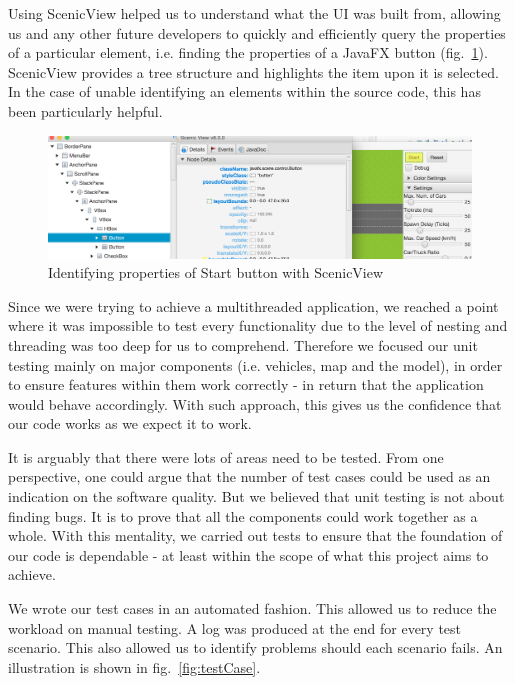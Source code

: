 Using ScenicView helped us to understand what the UI was built from, allowing us and any other future developers to quickly and efficiently query the properties of a particular element, i.e. finding the properties of a JavaFX button (fig.~\ref{fig:scenicview}). ScenicView provides a tree structure and highlights the item upon it is selected. In the case of unable identifying an elements within the source code, this has been particularly helpful.  
\begin{figure}[h]
	\begin{center}
		\includegraphics[width=\textwidth]{img/scenicView.png}
		\caption[Identifying properties of Start button with ScenicView]{Identifying properties of Start button with ScenicView}
		\label{fig:scenicview}
	\end{center}
\end{figure}

Since we were trying to achieve a multithreaded application, we reached a point where it was impossible to test every functionality due to the level of nesting and threading was too deep for us to comprehend. Therefore we focused our unit testing mainly on major components (i.e. vehicles, map and the model), in order to ensure features within them work correctly - in return that the application would behave accordingly. With such approach, this gives us the confidence that our code works as we expect it to work. 

It is arguably that there were lots of areas need to be tested. From one perspective, one could argue that the number of test cases could be used as an indication on the software quality. But we believed that unit testing is not about finding bugs. It is to prove that all the components could work together as a whole.  With this mentality, we carried out tests to ensure that the foundation of our code is dependable - at least within the scope of what this project aims to achieve.  

We wrote our test cases in an automated fashion. This allowed us to reduce the workload on manual testing.  A log was produced at the end for every test scenario. This also allowed us to identify problems should each scenario fails. An illustration is shown in fig.~\ref{fig:testCase}. 

